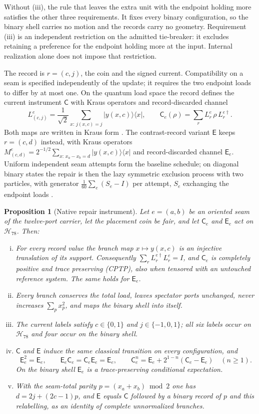 \documentclass[11pt]{article}
\newtheorem{proposition}[theorem]{Proposition}
\theoremstyle{definition}
\theoremstyle{remark}
\theoremstyle{plain}
\newcommand{\ket}[1]{\lvert #1\rangle}
\newcommand{\bra}[1]{\langle #1\rvert}
\newcommand{\Cn}{\mathsf{C}}
\newcommand{\En}{\mathsf{E}}
\newcommand{\Hil}{\mathcal{H}}
\begin{document}
Without (iii), the rule that leaves the extra unit with the endpoint holding
more satisfies the other three requirements. It fixes every binary
configuration, so the binary shell carries no motion and the records carry
no geometry. Requirement (iii) is an independent restriction on the
admitted tie-breaker: it excludes retaining a preference for the endpoint
holding more at the input. Internal realization alone does not impose that restriction.

The record is $r=(c,j)$, the coin and the signed
current. Compatibility on a seam is specified independently of the update;
it requires the two endpoint loads to differ by at most one. On the quantum load space the
record defines the current instrument $\Cn$ with Kraus operators and
record-discarded channel
\begin{equation}
\label{eq:kraus}
L^{e}_{(c,j)}=\frac{1}{\sqrt2}\sum_{x:\,j(x,c)=j}\ket{y(x,c)}\bra{x},
\qquad
\Cn_e(\rho)=\sum_{r}L^{e}_{r}\,\rho\,L^{e\dagger}_{r}.
\end{equation}
Both maps are written in Kraus form \cite{kraus1983}. The contrast-record
variant $\En$ keeps $r=(c,d)$ instead, with Kraus operators $M^{e}_{(c,d)}=2^{-1/2}\sum_{x:\,x_a-x_b=d}\ket{y(x,c)}\bra{x}$ and
record-discarded channel $\En_e$. Uniform independent seam attempts form the
baseline schedule; on diagonal binary states the repair is then the lazy symmetric exclusion process with two particles, with generator $\frac1{60}\sum_e(S_e-I)$ per attempt, $S_e$ exchanging the endpoint loads \cite{mCANDIDATES,oQM}.

\begin{proposition}[Native repair instrument]
\label{prop:native}
Let $e=(a,b)$ be an oriented seam of the twelve-port carrier, let the
placement coin be fair, and let $\Cn_e$ and $\En_e$ act on $\Hil_{78}$. Then:
\begin{enumerate}[(i)]
\item For every record value the branch map $x\mapsto y(x,c)$ is an injective
translation of its support. Consequently $\sum_rL^{e\dagger}_rL^e_r=I$, and
$\Cn_e$ is completely positive and trace preserving (CPTP), also when
tensored with an untouched reference system. The same holds for $\En_e$.
\item Every branch conserves the total load, leaves spectator ports
unchanged, never increases $\sum_px_p^2$, and maps the binary shell into
itself.
\item The current labels satisfy $c\in\{0,1\}$ and $j\in\{-1,0,1\}$; all six
labels occur on $\Hil_{78}$ and four occur on the binary shell.
\item $\Cn$ and $\En$ induce the same classical transition on every
configuration, and
\[
\En_e^2=\En_e,\qquad \En_e\Cn_e=\Cn_e\En_e=\En_e,\qquad
\Cn_e^n=\En_e+2^{1-n}(\Cn_e-\En_e)\quad(n\ge1).
\]
On the binary shell $\En_e$ is a trace-preserving conditional expectation.
\item With the seam-total parity $p=(x_a+x_b)\bmod 2$ one has
$d=2j+(2c-1)p$, and $\En$ equals $\Cn$ followed by a binary record of $p$
and this relabelling, as an identity of complete unnormalized branches.
\end{enumerate}
\end{proposition}
\end{document}
